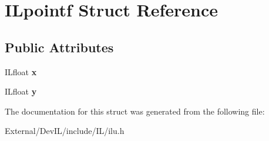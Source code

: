 \hypertarget{structILpointf}{
\section{ILpointf Struct Reference}
\label{structILpointf}
}
\subsection*{Public Attributes}
\begin{DoxyCompactItemize}
\item 
\hypertarget{structILpointf_a62747a41be202476c363e455f70ddeb1}{
ILfloat {\bfseries x}}
\label{structILpointf_a62747a41be202476c363e455f70ddeb1}

\item 
\hypertarget{structILpointf_aac46ba52351d952dd3baa994fae3f97d}{
ILfloat {\bfseries y}}
\label{structILpointf_aac46ba52351d952dd3baa994fae3f97d}

\end{DoxyCompactItemize}


The documentation for this struct was generated from the following file:\begin{DoxyCompactItemize}
\item 
External/DevIL/include/IL/ilu.h\end{DoxyCompactItemize}
